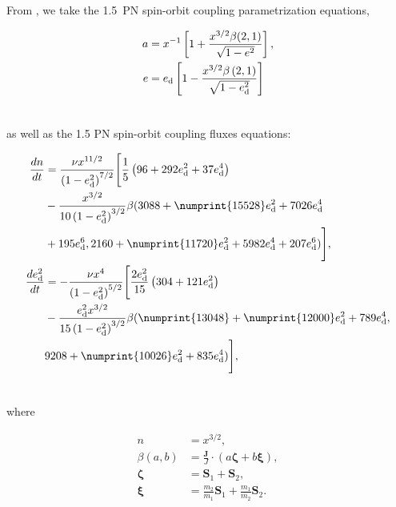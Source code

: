 \documentclass[usenatbib]{mnras}
\begin{document}
From \cite{jetzer}, we take the 1.5~PN spin-orbit coupling parametrization equations,

\begin{align}
a &= x^{-1} \left[ 1 + \frac{x^{3/2} \beta(2,1)}{\sqrt{1-e^2}} 
\right], \\
e &= e_{\rm d} \left[ 1 - \frac{x^{3/2} \beta \left(2, 1
\right)}{\sqrt{1-e_{\rm d}^2}} \right] \\ \nonumber
\end{align}

\noindent as well as the 1.5 PN spin-orbit coupling fluxes equations:

\begin{align}
\frac{dn}{dt} &= \frac{\nu x^{11/2}}{\left(1 - e_{\rm d}^2\right)^{7/2}} \Bigg[
\frac{1}{5} \left( 96 + 292 e_{\rm d}^2 + 37 e_{\rm d}^4 \right) \nonumber\\
&-
\frac{x^{3/2}}{10\left(1 - e_{\rm d}^2\right)^{3/2}} \beta ( 3088 +
\numprint{15528}e_{\rm d}^2 + 7026 e_{\rm d}^4 \nonumber \\
&+ 195e_{\rm d}^6, 2160 + \numprint{11720} e_{\rm d}^2 + 5982 e_{\rm d}^4
+ 207 e_{\rm d}^6 )\Bigg], \\
\frac{de_{\rm d}^2}{dt} &= -\frac{\nu x^4}{\left(1 - e_{\rm d}^2\right)^{5/2}} \Bigg[
\frac{2e_{\rm d}^2}{15} \left( 304 + 121 e_{\rm d}^2 \right) \nonumber\\
&- \frac{e_{\rm d}^2 x^{3/2}}{15\left(1 -
e_{\rm d}^2\right)^{3/2}} \beta ( \numprint{13048} + \numprint{12000} e_{\rm d}^2 + 789
e_{\rm d}^4, \nonumber \\
& 9208 + \numprint{10026} e_{\rm d}^2 + 835 e_{\rm d}^4 )\Bigg],\\ \nonumber
\end{align}

\noindent where

\begin{align}
n &= x^{3/2},\\
\beta(a,b) &= \frac{\mathbf{J}}{J} \cdot \left( a \mathbf{\zeta} + b \mathbf{ \xi } \right),\\
 \mathbf{ \zeta } &= \mathbf{S}_1 + \mathbf{S}_2, \\
 \mathbf{\xi} &= \frac{m_2}{m_1} \mathbf{S}_1 + \frac{m_1}{m_2} \mathbf{S}_2. \\ \nonumber
 \end{align}


\bsp %
\label{lastpage}
\end{document}
